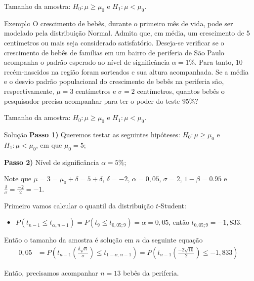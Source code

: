 \documentclass[8pt]{beamer}
\begin{document}
\begin{frame}{Tamanho da amostra: $H_0:\mu \geq \mu_0$ e $H_1: \mu < \mu_0$.}

\large

\begin{block}{Exemplo}
	O crescimento de bebês, durante o primeiro mês de vida, pode ser modelado pela distribuição Normal. Admita que, em média, um crescimento de 5 centímetros ou mais seja considerado satisfatório. Deseja-se verificar se o crescimento de bebês de famílias em um bairro de periferia de São Paulo acompanha o padrão esperado ao nível de significância $\alpha=1\%$. Para tanto, 10 recém-nascidos na região foram sorteados e sua altura acompanhada. Se a média e o desvio padrão populacional do crescimento de bebês na periferia são, respectivamente, $\mu=3$ centímetros e $\sigma=2$ centímetros, quantos bebês o pesquisador precisa acompanhar para ter o poder do teste $95\%$?
\end{block}

\normalsize

\end{frame}



\begin{frame}{Tamanho da amostra: $H_0:\mu \geq \mu_0$ e $H_1: \mu < \mu_0$.}


\begin{block}{Solução}
	\textbf{Passo 1)} Queremos testar as seguintes hipóteses: $H_0: \mu \geq \mu_0$ e $H_1: \mu < \mu_0$, em que $\mu_0=5$;

	\textbf{Passo 2)} Nível de significância $\alpha = 5\%$;
	
	Note que $\mu=3=\mu_0+\delta=5+\delta$, $\delta=-2$, $\alpha=0,05$, $\sigma=2$, $1-\beta=0.95$ e $\frac{\delta}{\sigma} = \frac{-2}{2}=-1$.
	
	Primeiro vamos calcular o quantil da distribuição $t$-Student:
	\begin{itemize}
		\item $P\left( t_{n-1} \leq t_{\alpha, n-1} \right) = P\left( t_9 \leq t_{0,05; 9} \right) = \alpha = 0,05$, então $t_{0,05; 9} = -1,833$.
	\end{itemize}
	
	Então o tamanho da amostra é solução em $n$ da seguinte equação
	\begin{align*}
	0,05 &= P\left( t_{n-1}\left(\frac{\delta\sqrt{n}}{\sigma}\right) \leq t_{1-\alpha, n-1} \right) = P \left( t_{n-1}\left( \frac{-2\sqrt{10}}{2} \right) \leq -1,833 \right)
	\end{align*} 
\end{block}
Então, precisamos acompanhar $n=13$ bebês da periferia.


\end{frame}
\end{document}
